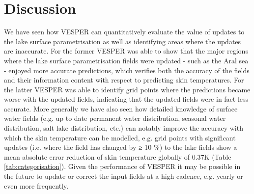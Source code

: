\documentclass[hess, twostagejnl]{copernicus}
\begin{document}
\section{Discussion} \label{sec:discussion}
We have seen how VESPER can quantitatively evaluate the value of updates to the lake surface parametrisation as well as identifying areas where the updates are inaccurate. For the former VESPER was able to show that the major regions where the lake surface parametrisation fields were updated - such as the Aral sea - enjoyed more accurate predictions, which verifies both the accuracy of the fields and their information content with respect to predicting skin temperatures. For the latter VESPER was able to identify grid points where the predictions became worse with the updated fields, indicating that the updated fields were in fact less accurate. More generally we have also seen how detailed knowledge of surface water fields (e.g. up to date permanent water distribution, seasonal water distribution, salt lake distribution, etc.) can notably improve the accuracy with which the skin temperature can be modelled, e.g. grid points with significant updates (i.e. where the field has changed by ≥ 10 \%) to the lake fields show a mean absolute error reduction of skin temperature globally of 0.37K (Table \ref{tab:categorisation}). Given the performance of VESPER it may be possible in the future to update or correct the input fields at a high cadence, e.g. yearly or even more frequently.   \newline 
\end{document}
